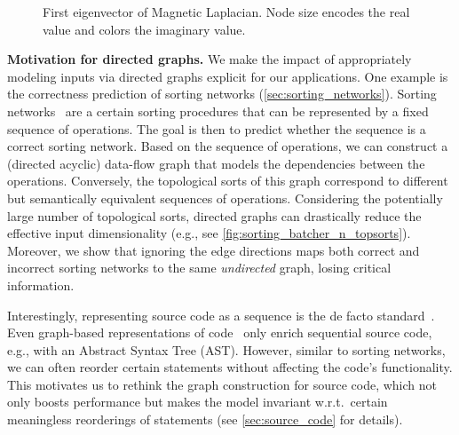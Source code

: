 \documentclass{article}
\begin{document}
\begin{figure}[b]
  \centering
  \makebox[\linewidth][c]{
    
  }
  \caption{First eigenvector of Magnetic Laplacian. Node size encodes the real value and colors the imaginary value.}
  \label{fig:example_graphs}
\end{figure}

\textbf{Motivation for directed graphs.} We make the impact of appropriately modeling inputs via directed graphs explicit for our applications. One example is the correctness prediction of sorting networks (\autoref{sec:sorting_networks}). Sorting networks~\citep{knuth_art_1973} are a certain sorting procedures that can be represented by a fixed sequence of operations. The goal is then to predict whether the sequence is a correct sorting network. Based on the sequence of operations, we can construct a (directed acyclic) data-flow graph that models the dependencies between the operations. Conversely, the topological sorts of this graph correspond to different but semantically equivalent sequences of operations. Considering the potentially large number of topological sorts, directed graphs can drastically reduce the effective input dimensionality (e.g., see \autoref{fig:sorting_batcher_n_topsorts}). Moreover, we show that ignoring the edge directions maps both correct and incorrect sorting networks to the same \emph{undirected} graph, losing critical information.

Interestingly, representing source code as a sequence is the de facto standard~\citep{li_competition-level_2022, feng_codebert_2020, chen_evaluating_2021, openai_chatgpt_2022}. Even graph-based representations of code~\citep{allamanis_learning_2018, hu_open_2020,  cummins_programl_2020, guo_graphcodebert_2021, bieber_library_2022} only enrich sequential source code, e.g., with an Abstract Syntax Tree (AST). However, similar to sorting networks, we can often reorder certain statements without affecting the code's functionality. This motivates us to rethink the graph construction for source code, which not only boosts performance but makes the model invariant w.r.t.\ certain meaningless reorderings of statements (see \autoref{sec:source_code} for details).
\end{document}
